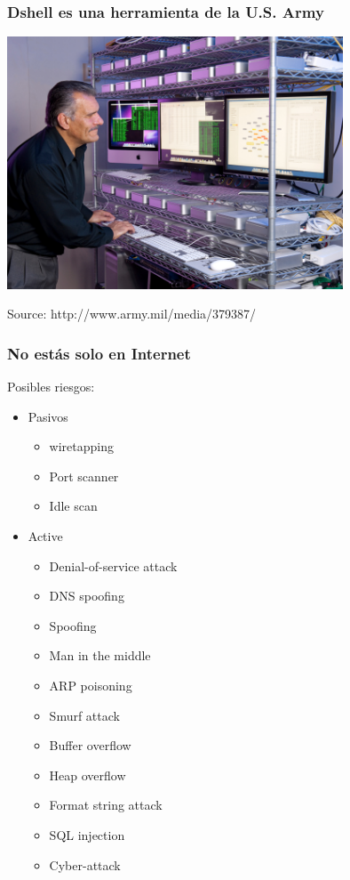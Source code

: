 \begin{frame}
\frametitle{Dshell es una herramienta de la U.S. Army}

\begin{center}
  \includegraphics[width=10cm]{figs/dshell}
\end{center}


\begin{flushright}
{\tiny
Source: http://www.army.mil/media/379387/
}
\end{flushright}

\end{frame}




\begin{frame}
\frametitle{No estás solo en Internet}

Posibles riesgos:

\begin{itemize}
  \item Pasivos
    \begin{itemize}
      \item wiretapping
      \item Port scanner
      \item Idle scan
    \end{itemize}
  \item Active
    \begin{itemize}
      \item Denial-of-service attack
      \item DNS spoofing
      \item Spoofing
      \item Man in the middle
      \item ARP poisoning
      \item Smurf attack
      \item Buffer overflow
      \item Heap overflow
      \item Format string attack
      \item SQL injection
      \item Cyber-attack
    \end{itemize}   
\end{itemize}

\end{frame}



